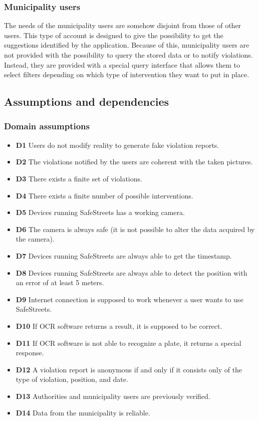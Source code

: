 \documentclass[a4paper]{article}
\begin{document}
\subsubsection{Municipality users}

The needs of the municipality users are somehow disjoint from those of
other users. This type of account is designed to give the possibility to
get the suggestions identified by the application. Because of this,
municipality users are not provided with the possibility to query the
stored data or to notify violations. Instead, they are provided with a
special query interface that allows them to select filters depending on
which type of intervention they want to put in place.

\subsection{Assumptions and dependencies}

\subsubsection{Domain assumptions}

\begin{itemize}
\item
  \textbf{D1} Users do not modify reality to generate fake violation
  reports.
\item
  \textbf{D2} The violations notified by the users are coherent with the
  taken pictures.
\item
  \textbf{D3} There exists a finite set of violations.
\item
  \textbf{D4} There exists a finite number of possible interventions.
\item
  \textbf{D5} Devices running SafeStreets has a working camera.
\item
  \textbf{D6} The camera is always safe (it is not possible to alter the
  data acquired by the camera).
\item
  \textbf{D7} Devices running SafeStreets are always able to get the
  timestamp.
\item
  \textbf{D8} Devices running SafeStreets are always able to detect the
  position with an error of at least 5 meters.
\item
  \textbf{D9} Internet connection is supposed to work whenever a user
  wants to use SafeStreets.
\item
  \textbf{D10} If OCR software returns a result, it is supposed to be
  correct.
\item
  \textbf{D11} If OCR software is not able to recognize a plate, it
  returns a special response.
\item
  \textbf{D12} A violation report is anonymous if and only if it
  consists only of the type of violation, position, and date.
\item
  \textbf{D13} Authorities and municipality users are previously
  verified.
\item
  \textbf{D14} Data from the municipality is reliable.
\end{itemize}
\end{document}
